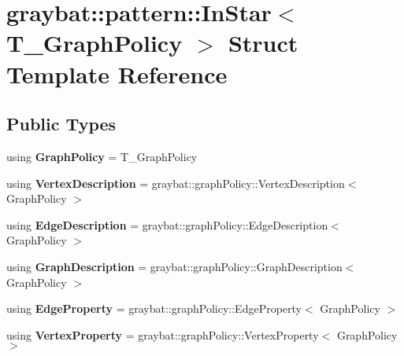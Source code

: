 \hypertarget{structgraybat_1_1pattern_1_1InStar}{}\section{graybat\+:\+:pattern\+:\+:In\+Star$<$ T\+\_\+\+Graph\+Policy $>$ Struct Template Reference}
\label{structgraybat_1_1pattern_1_1InStar}
\subsection*{Public Types}
\begin{DoxyCompactItemize}
\item 
\hypertarget{structgraybat_1_1pattern_1_1InStar_ab93c343a8968f71e6502f30e22528ce9}{}using {\bfseries Graph\+Policy} = T\+\_\+\+Graph\+Policy\label{structgraybat_1_1pattern_1_1InStar_ab93c343a8968f71e6502f30e22528ce9}

\item 
\hypertarget{structgraybat_1_1pattern_1_1InStar_a14e587a9930f8907ae0c4a512b98c277}{}using {\bfseries Vertex\+Description} = graybat\+::graph\+Policy\+::\+Vertex\+Description$<$ Graph\+Policy $>$\label{structgraybat_1_1pattern_1_1InStar_a14e587a9930f8907ae0c4a512b98c277}

\item 
\hypertarget{structgraybat_1_1pattern_1_1InStar_a38d750a72045520f0ddf3eecb0809995}{}using {\bfseries Edge\+Description} = graybat\+::graph\+Policy\+::\+Edge\+Description$<$ Graph\+Policy $>$\label{structgraybat_1_1pattern_1_1InStar_a38d750a72045520f0ddf3eecb0809995}

\item 
\hypertarget{structgraybat_1_1pattern_1_1InStar_a084fbbda9f3c382c42855c67d0808b44}{}using {\bfseries Graph\+Description} = graybat\+::graph\+Policy\+::\+Graph\+Description$<$ Graph\+Policy $>$\label{structgraybat_1_1pattern_1_1InStar_a084fbbda9f3c382c42855c67d0808b44}

\item 
\hypertarget{structgraybat_1_1pattern_1_1InStar_aa4f512e54f052261b2146f0af14670b6}{}using {\bfseries Edge\+Property} = graybat\+::graph\+Policy\+::\+Edge\+Property$<$ Graph\+Policy $>$\label{structgraybat_1_1pattern_1_1InStar_aa4f512e54f052261b2146f0af14670b6}

\item 
\hypertarget{structgraybat_1_1pattern_1_1InStar_a1cafeb7a0527ee503649ba674f774495}{}using {\bfseries Vertex\+Property} = graybat\+::graph\+Policy\+::\+Vertex\+Property$<$ Graph\+Policy $>$\label{structgraybat_1_1pattern_1_1InStar_a1cafeb7a0527ee503649ba674f774495}

\end{DoxyCompactItemize}
